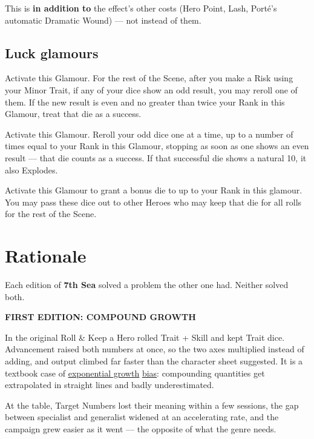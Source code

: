 \documentclass[10pt,twoside,openany]{book}
\begin{document}
	This is \textbf{in addition to} the effect's other costs (Hero Point, Lash, Port\'e's automatic Dramatic Wound) --- not instead of them.
	
	\subsection{Luck glamours}
	
	
	Activate this Glamour. For the rest of the Scene, after you make a Risk using your Minor Trait, if any of your dice show an odd result, you may reroll one of them. If the new result is even and no greater than twice your Rank in this Glamour, treat that die as a success.
	
	Activate this Glamour. Reroll your odd dice one at a time, up to a number of times equal to your Rank in this Glamour, stopping as soon as one shows an even result — that die counts as a success. If that successful die shows a natural 10, it also Explodes.
	
	Activate this Glamour to grant a bonus die to up to your Rank in this glamour.  You may pass these
	dice out to other Heroes who may keep that die for
	all rolls for the rest of the Scene.
	
	\section{Rationale}
	
	Each edition of \textbf{7th Sea} solved a problem the other one had. Neither solved both.
	
	\vspace{1em}
	\textbf{FIRST EDITION: COMPOUND GROWTH}
	
	In the original Roll \& Keep a Hero rolled Trait + Skill and kept Trait dice.
	Advancement raised both numbers at once, so the two axes multiplied instead of
	adding, and output climbed far faster than the character sheet suggested. It is a
	textbook case of \underline{\href{https://en.wikipedia.org/wiki/Exponential_growth\#Exponential_growth_bias}{exponential growth}}
	\underline{\href{https://en.wikipedia.org/wiki/Exponential_growth\#Exponential_growth_bias}{bias}}: compounding quantities get extrapolated in straight lines and badly underestimated.
	
	At the table, Target Numbers lost their meaning within a few sessions, the gap
	between specialist and generalist widened at an accelerating rate, and the campaign
	grew easier as it went — the opposite of what the genre needs.
	
\end{document}
